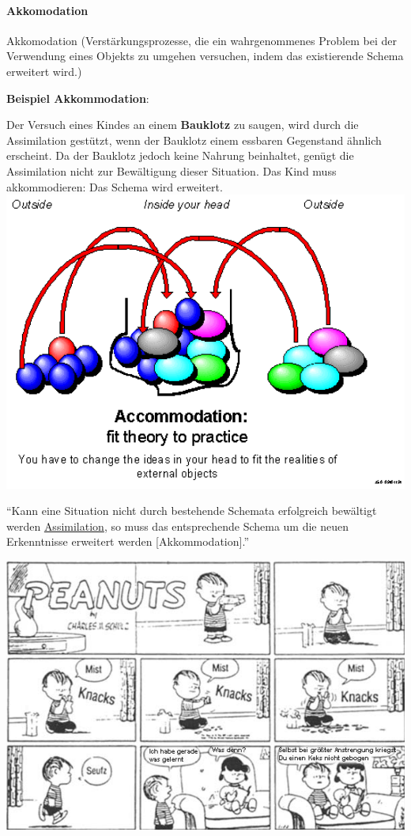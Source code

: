 \documentclass[
  letterpaper,
]{scrbook}
\let\oldparagraph\paragraph
\renewcommand{\paragraph}[1]{\oldparagraph{#1}\mbox{}}
\begin{document}
\hypertarget{akkomodation}{%
\paragraph{Akkomodation}\label{akkomodation}}

Akkomodation (Verstärkungsprozesse, die ein wahrgenommenes Problem bei
der Verwendung eines Objekts zu umgehen versuchen, indem das
existierende Schema erweitert wird.)

\textbf{Beispiel Akkommodation}:

Der Versuch eines Kindes an einem \textbf{Bauklotz} zu saugen, wird
durch die Assimilation gestützt, wenn der Bauklotz einem essbaren
Gegenstand ähnlich erscheint. Da der Bauklotz jedoch keine Nahrung
beinhaltet, genügt die Assimilation nicht zur Bewältigung dieser
Situation. Das Kind muss akkommodieren: Das Schema wird erweitert.\\

\includegraphics[width=1\textwidth,height=\textheight]{./pictures/akkomodation.png}

\hfill\break
``Kann eine Situation nicht durch bestehende Schemata erfolgreich
bewältigt werden \protect\hyperlink{assimilation}{Assimilation}, so muss
das entsprechende Schema um die neuen Erkenntnisse erweitert werden
{[}Akkommodation{]}.''

\includegraphics[width=1\textwidth,height=\textheight]{./pictures/peanuts_assimilation_akkomodation.png}
\end{document}
